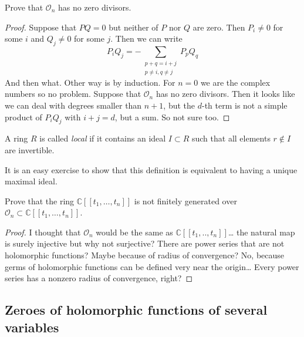 \begin{exercise}
\label{exercise-stalk-has-no-zero-divisors}
Prove that $\mathcal{O}_n$ has no zero divisors.
\end{exercise}

\begin{proof}
Suppose that $PQ=0$ but neither of $P$ nor $Q$ are zero. Then $P_i \neq 0$ for
some $i$ and $Q_j \neq 0$ for some $j$. Then we can write
$$
P_iQ_j=-\sum_{\substack{p+q=i+j \\ p\neq i,q\neq j}}P_pQ_q
$$
And then what. Other way is by induction. For $n=0$ we are the complex numbers
so no problem. Suppose that $\mathcal{O}_n$ has no zero divisors. Then it looks
like we can deal with degrees smaller than $n+1$, but the $d$-th term is not a
simple product of $P_iQ_j$ with $i+j=d$, but a sum. So not sure too.
\end{proof}

\begin{definition}
\label{definition-local-ring}
A ring $R$ is called {\it local} if it contains an ideal $I\subset R$ such that
all elements $r \not \in I$ are invertible.
\end{definition}

It is an easy exercise to show that this definition is equivalent to having a
unique maximal ideal.

\begin{exercise}
\label{exercise-power-series-is-not-finitely-generated-over-stalk}
Prove that the ring $\mathbb{C}[\![ t_1,\ldots,t_n]\!]$ is not
finitely generated over $\mathcal{O}_n \subset 
\mathbb{C}[\![ t_1,\ldots,t_n]\!]$.
\end{exercise}

\begin{proof}
I thought that $\mathcal{O}_n$ would be the same as 
$\mathbb{C}[\![ t_1,..,t_n]\!]$… the natural map is surely injective
but why not surjective? There are power series that are not holomorphic
functions? Maybe because of radius of convergence? No, because germs of
holomorphic functions can be defined very near the origin… Every power series
has a nonzero radius of convergence, right?
\end{proof}

\subsection{Zeroes of holomorphic functions of several variables}
\label{subsection-zeroes-of-holomorphic-functions-of-several-variables}


